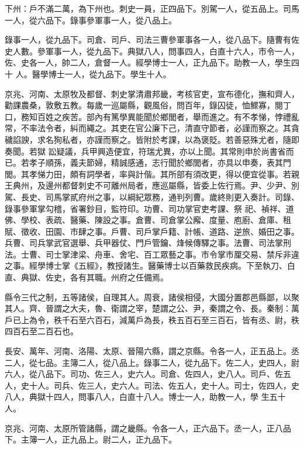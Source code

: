 \begin{pinyinscope}
 下州：戶不滿二萬，為下州也。刺史一員，正四品下。別駕一人，從五品上。司馬一人，從六品下。錄事參軍事一人，從八品上。



 錄事一人，從九品下。司倉、司戶、司法三曹參軍事各一人，從八品下。隨曹有佐史人數。參軍事一人，從九品下。典獄八人，問事四人，白直十六人，市令一人，佐、史各一人，帥二人，倉督一人。經學博士一人，正九品下。助教一人，學生四十
 人。醫學博士一人，從九品下。學生十人。



 京兆、河南、太原牧及都督、刺史掌清肅邦畿，考核官吏，宣布德化，撫和齊人，勸課農桑，敦敷五教。每歲一巡屬縣，觀風俗，問百年，錄囚徒，恤鰥寡，閱丁口，務知百姓之疾苦。部內有篤學異能聞於鄉閭者，舉而進之。有不孝悌，悖禮亂常，不率法令者，糾而繩之。其吏在官公廉下己，清直守節者，必謹而察之。其貪穢諂諛，求名狥私者，亦謹而察之。皆附於考課，以為褒貶。若善惡殊尤者，隨即奏聞。若獄
 訟疑議，兵甲興造便宜，符瑞尤異，亦以上聞。其常則申於尚書省而已。若孝子順孫，義夫節婦，精誠感通，志行聞於鄉閭者，亦具以申奏，表其門閭。其孝悌力田，頗有詞學者，率與計偕。其所部有須改更，得以便宜從事。若親王典州，及邊州都督刺史不可離州局者，應巡屬縣，皆委上佐行焉。尹、少尹、別駕、長史、司馬掌貳府州之事，以綱紀眾務，通判列曹。歲終則更入奏計。司錄、錄事參軍掌勾稽，省署鈔目，監符印。功曹、司功掌官吏考課、祭
 祀、禎祥、道佛、學校、表疏、醫藥、陳設之事。倉曹、司倉掌公廨、度量、庖廚、倉庫、租賦、徵收、田園、市肆之事。戶曹、司戶掌戶籍、計帳、道路、逆旅、婚田之事。兵曹、司兵掌武官選舉、兵甲器仗、門戶管鑰、烽候傳驛之事。法曹、司法掌刑法。士曹、司士掌津梁、舟車、舍宅、百工眾藝之事。市令掌市厘交易、禁斥非違之事。經學博士掌《五經》，教授諸生。醫藥博士以百藥救民疾病。下至執刀、白直、典獄、佐史，各有其職。州府之任備焉。



 縣令三代之制，五等諸侯，自理其人。周衰，諸侯相侵，大國分置郡邑縣鄙，以聚其人。齊、晉謂之大夫，魯、衛謂之宰，楚謂之公、尹，秦謂之令、長。秦制：萬戶已上為令，秩千石至六百石，減萬戶為長，秩五百石至三百石，皆有丞、尉，秩四百石至二百石也。



 長安、萬年、河南、洛陽、太原、晉陽六縣，謂之京縣。令各一人，正五品上。丞二人，從七品。主簿二人，從八品上。錄事二人，從九品下。佐二人，史四人，尉六人，從八品下。司功、佐三人，史六人。司倉、佐四人，史八人。司戶、佐五人，史十人。司兵、佐三人，史六人。司法、佐五人，史十人。司士，佐四人，史八人，典獄十四人，問事八人，白直十八人。博士一人，助教一人，學
 生五十人。



 京兆、河南、太原所管諸縣，謂之畿縣。令各一人，正六品下。丞一人，正八品下。主簿一人，正九品上。尉二人，正九品下。




\end{pinyinscope}
